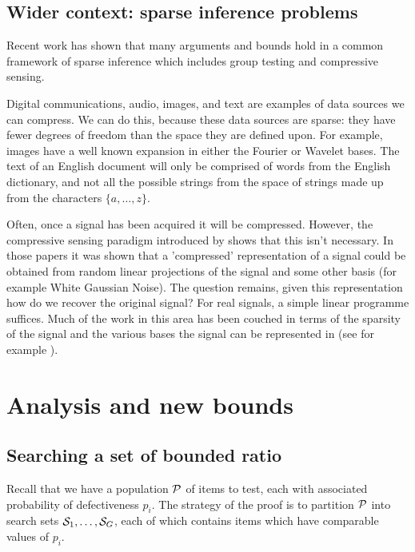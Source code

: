 \subsection{Wider context: sparse inference problems}

Recent work \cite{aksoylar,tan} has shown that many arguments and bounds hold in a common framework of sparse inference
which includes group testing and compressive sensing.

Digital communications, audio, images, and text are examples of data sources we can compress. We can do this, because these data sources are sparse: they have fewer degrees of freedom than the space they are defined upon. 
For example, images have a well known expansion in either the Fourier or Wavelet bases. The text of an English document will only be comprised of words from the English dictionary, and not all the possible strings from the space of strings made up from the characters \(\{a, \ldots, z \}\). 

Often, once a signal has been acquired it will be compressed. However, the compressive sensing paradigm introduced by
\cite{candes,donoho2} shows that this isn't necessary. In those papers it was shown that a 'compressed' representation of a signal could be obtained from random linear projections of the signal and some other basis (for example White Gaussian Noise). The question remains, given this representation how do we recover the original signal? For real signals, a simple linear programme suffices.
Much of the work in this area has been couched in terms of the sparsity of the signal and the various bases the signal can be represented in (see for example \cite{candes,donoho2}). 


\section{Analysis and new bounds}

\subsection{Searching a set of bounded ratio} \label{sec:boundedratio}

Recall that we have a population ${\mathcal{P}}$ of items to test, each with associated probability of defectiveness $p_i$.
The strategy of the proof is to partition ${\mathcal{P}}$ 
 into search sets ${\mathcal{S}}_1, \ldots, {\mathcal{S}}_G$, each of which contains items which have
comparable values of $p_i$.

